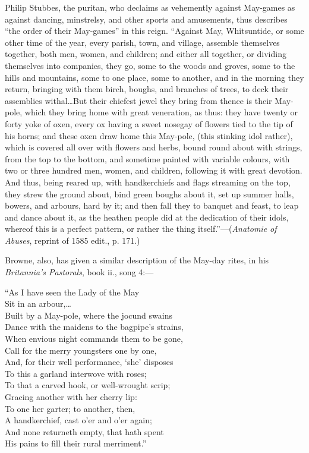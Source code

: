 Philip Stubbes, the puritan, who declaims as vehemently against May-games as
against dancing, minstrelsy, and other sports and amusements, thus describes
“the order of their May-games” in this reign. “Against May, Whitsuntide, or
some other time of the year, every parish, town, and village, assemble themselves
together, both men, women, and children; and either all together, or dividing
themselves into companies, they go, some to the woods and groves, some to the
hills and mountains, some to one place, some to another, and in the morning they
return, bringing with them birch, boughs, and branches of trees, to deck their
assemblies withal\ldots  But their chiefest jewel they bring from thence is their
May-pole, which they bring home with great veneration, as thus: they have
twenty or forty yoke of oxen, every ox having a sweet nosegay of flowers tied to
the tip of his horns; and these oxen draw home this May-pole, (this stinking
idol rather), which is covered all over with flowers and herbs, bound round
about with strings, from the top to the bottom, and sometime painted with
variable colours, with two or three hundred men, women, and children, following
it with great devotion. And thus, being reared up, with handkerchiefs
and flags streaming on the top, they strew the ground about, bind green boughs
about it, set up summer halls, bowers, and arbours, hard by it; and then fall
they to banquet and feast, to leap and dance about it, as the heathen people
did at the dedication of their idols, whereof this is a perfect pattern, or rather
the thing itself.”—(\textit{Anatomie of Abuses}, reprint of 1585 edit., p. 171.)

Browne, also, has given a similar description of the May-day rites, in his
\textit{Britannia's Pastorals}, book ii., song 4:—
\settowidth{\versewidth}{When envious night commands them to be gone,}
\begin{scverse}
“As I have seen the Lady of the May\\
Sit in an arbour,\ldots\\
Built by a May-pole, where the jocund swains\\
Dance with the maidens to the bagpipe’s strains,\\
When envious night commands them to be gone,\\
Call for the merry youngsters one by one,\\
And, for their well performance, ‘she’ disposes\\
To this a garland interwove with roses;\\
To that a carved hook, or well-wrought scrip;\\
Gracing another with her cherry lip:\\
To one her garter; to another, then,\\
A handkerchief, cast o’er and o’er again;\\
And none returneth empty, that hath spent\\
His pains to fill their rural merriment.”
\end{scverse}

